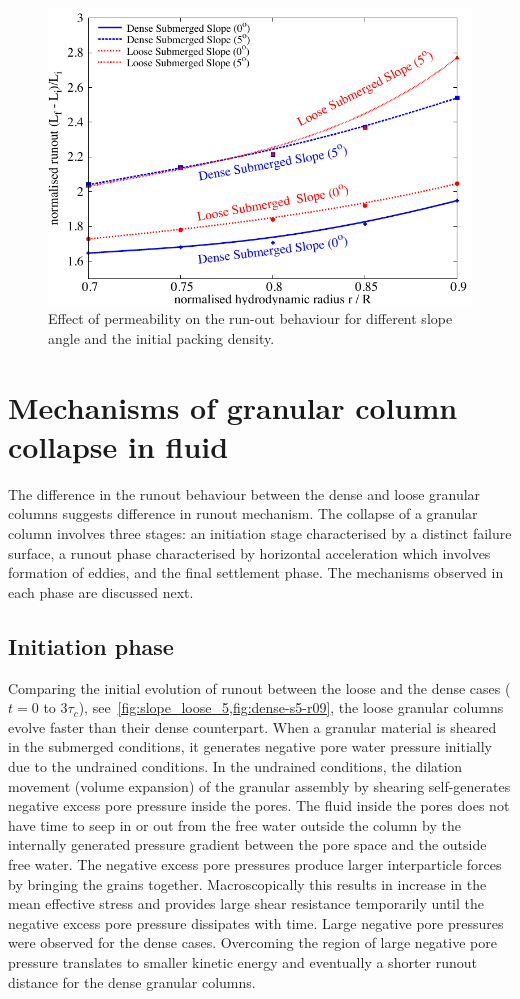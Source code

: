 \documentclass[12pt,twoside]{tuhhproc-en}
\begin{document}
\begin{figure}
\centering
\includegraphics[width=0.97\columnwidth]{figs/Perm_Runout_slope}
\caption{Effect of permeability on the run-out behaviour for different slope 
angle and the initial packing density.}
\label{fig:Perm_Runout_slope}
\end{figure}

\section{Mechanisms of granular column collapse in fluid}
The difference in the runout behaviour between the dense and loose granular columns suggests difference in runout mechanism. The collapse of a granular column involves three stages: an initiation stage characterised by a distinct failure surface, a runout phase characterised by horizontal acceleration which involves formation of eddies, and the final settlement phase. The mechanisms observed in each phase are discussed next.

\subsection{Initiation phase}
Comparing the initial evolution of runout between the loose and the dense cases ($t = 0$ to $3\tau_c$), see~\cref{fig:slope_loose_5,fig:dense-s5-r09}, the loose granular columns evolve faster than their dense counterpart. When a granular material is sheared in the submerged conditions, it generates negative pore water pressure initially due to the undrained conditions. In the undrained conditions, the dilation movement (volume expansion) of the granular assembly by shearing self-generates negative excess pore pressure inside the pores. The fluid inside the pores does not have time to seep in or out from the free water outside the column by the internally generated pressure gradient between the pore space and the outside free water. The negative excess pore pressures produce larger interparticle forces by bringing the grains together. Macroscopically this results in increase in the mean effective stress and provides large shear resistance temporarily until the negative excess pore pressure dissipates with time. Large negative pore pressures were observed for the dense cases. Overcoming the region of large negative pore pressure translates to smaller kinetic energy and eventually a shorter runout distance for the dense granular columns. 
	
\end{document}
